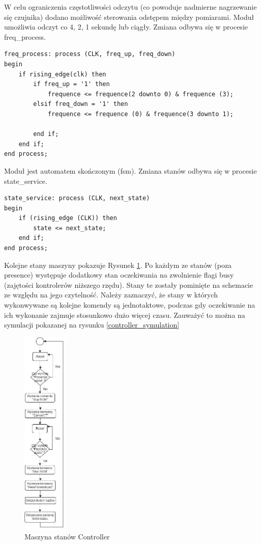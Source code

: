 \documentclass[a4paper]{article}
\begin{document}
W celu ograniczenia częstotliwości odczytu (co powoduje nadmierne nagrzewanie się czujnika) dodano możliwość sterowania odstępem między pomiarami. Moduł umożliwia odczyt co 4, 2, 1 sekundę lub ciągły. Zmiana odbywa się w procesie freq\_process.
\newpage
\lstset{language=VHDL}
\begin{lstlisting}[frame=single]
freq_process: process (CLK, freq_up, freq_down)
begin
	if rising_edge(clk) then
		if freq_up = '1' then
			frequence <= frequence(2 downto 0) & frequence (3);
		elsif freq_down = '1' then
			frequence <= frequence (0) & frequence(3 downto 1);

		end if;
	end if;
end process;
\end{lstlisting}

Moduł jest automatem skończonym (fsm). Zmiana stanów odbywa się w procesie  state\_service.

\lstset{language=VHDL}
\begin{lstlisting}[frame=single]
state_service: process (CLK, next_state)
begin
	if (rising_edge (CLK)) then
		state <= next_state;
	end if;
end process;
\end{lstlisting}

Kolejne stany maszyny pokazuje Rysunek \ref{controller_fsm}. Po każdym ze stanów (poza presence) występuje dodatkowy stan oczekiwania na zwolnienie flagi busy (zajętości kontrolerów niższego rzędu). Stany te zostały pominięte na schemacie ze względu na jego czytelność. Należy zaznaczyć, że stany w których wykonwywane są kolejne komendy są jednotaktowe, podczas gdy oczekiwanie na ich wykonanie zajmuje stosunkowo dużo więcej czasu. Zauważyć to można na symulacji pokazanej na rysunku \ref{controller_symulation}

\begin{figure}[H]
\begin{center}
\includegraphics[height=10cm]{graphics/controller_fsm.png}
\end{center}
\caption{Maszyna stanów Controller}
\label{controller_fsm}
\end{figure}
\end{document}
